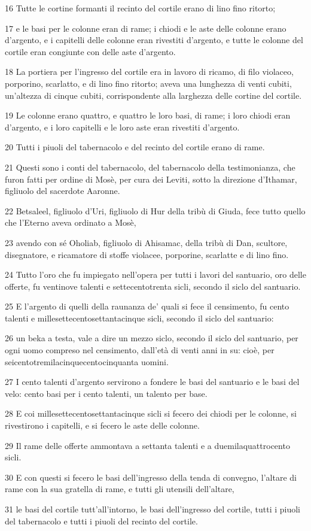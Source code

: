 \par 16 Tutte le cortine formanti il recinto del cortile erano di lino fino ritorto;
\par 17 e le basi per le colonne eran di rame; i chiodi e le aste delle colonne erano d'argento, e i capitelli delle colonne eran rivestiti d'argento, e tutte le colonne del cortile eran congiunte con delle aste d'argento.
\par 18 La portiera per l'ingresso del cortile era in lavoro di ricamo, di filo violaceo, porporino, scarlatto, e di lino fino ritorto; aveva una lunghezza di venti cubiti, un'altezza di cinque cubiti, corrispondente alla larghezza delle cortine del cortile.
\par 19 Le colonne erano quattro, e quattro le loro basi, di rame; i loro chiodi eran d'argento, e i loro capitelli e le loro aste eran rivestiti d'argento.
\par 20 Tutti i piuoli del tabernacolo e del recinto del cortile erano di rame.
\par 21 Questi sono i conti del tabernacolo, del tabernacolo della testimonianza, che furon fatti per ordine di Mosè, per cura dei Leviti, sotto la direzione d'Ithamar, figliuolo del sacerdote Aaronne.
\par 22 Betsaleel, figliuolo d'Uri, figliuolo di Hur della tribù di Giuda, fece tutto quello che l'Eterno aveva ordinato a Mosè,
\par 23 avendo con sé Oholiab, figliuolo di Ahisamac, della tribù di Dan, scultore, disegnatore, e ricamatore di stoffe violacee, porporine, scarlatte e di lino fino.
\par 24 Tutto l'oro che fu impiegato nell'opera per tutti i lavori del santuario, oro delle offerte, fu ventinove talenti e settecentotrenta sicli, secondo il siclo del santuario.
\par 25 E l'argento di quelli della raunanza de' quali si fece il censimento, fu cento talenti e millesettecentosettantacinque sicli, secondo il siclo del santuario:
\par 26 un beka a testa, vale a dire un mezzo siclo, secondo il siclo del santuario, per ogni uomo compreso nel censimento, dall'età di venti anni in su: cioè, per seicentotremilacinquecentocinquanta uomini.
\par 27 I cento talenti d'argento servirono a fondere le basi del santuario e le basi del velo: cento basi per i cento talenti, un talento per base.
\par 28 E coi millesettecentosettantacinque sicli si fecero dei chiodi per le colonne, si rivestirono i capitelli, e si fecero le aste delle colonne.
\par 29 Il rame delle offerte ammontava a settanta talenti e a duemilaquattrocento sicli.
\par 30 E con questi si fecero le basi dell'ingresso della tenda di convegno, l'altare di rame con la sua gratella di rame, e tutti gli utensili dell'altare,
\par 31 le basi del cortile tutt'all'intorno, le basi dell'ingresso del cortile, tutti i piuoli del tabernacolo e tutti i piuoli del recinto del cortile.


